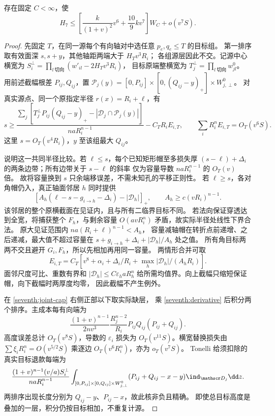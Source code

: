 \begin{lemma}[完整实际软价格]\label{seventh:local-price}
存在固定 \(C<\infty\)，使
\begin{equation}\label{seventh:soft-price}
 H_7\le
 \left[\frac{k}{(1+v)^2}v^6+\frac{10}{9}kv^7\right]W_C+o(v^7S).
\end{equation}
\end{lemma}
\begin{proof}
先固定 \(T\)，在同一源每个有向轴对中选任意 \(p_e,q_e\le T\) 的目标组。
第一排序取有效面深 \(s,s+y\)，其他轴距两端大于 \(H_Tv^3R_i\)；
各组源层因此不交。记源中心横宽为
\(S_i^\perp=\prod_{l\ \text{切向}}(w'_{il}-2H_Tv^3R_i)\)，
目标原端整横宽为 \(T_j^\perp=\prod_{l\ \text{切向}}w^0_{jl}\)。
用前述截幅根差 \(P_{ij},Q_{ij}\)，置
\(\mathcal P_j(y)=[0,P_{ij}]\times[0,(Q_{ij}-y)_+]\times W^0_{j,\perp}\)。
对真实源点、同一个原指定半径 \(r(x)=R_i+\ell\)，有
\begin{equation}\label{seventh:joint-cap}
 s\ge
 \frac{\sum_j[T_j^\perp P_{ij}(Q_{ij}-y)_+
                    -|\mathscr D_j\cap\mathcal P_j(y)|]}
      {naR_i^{n-1}}-C_TR_iE_{i,T},
 \qquad \sum_iR_i^nE_{i,T}=O_T(v^6S).
\end{equation}
这里 \(s=O_T(v^4R_i)\)，\(y\) 至该组最大 \(Q_{ij}\)。

说明这一共同半径比较。若 \(\ell\le s\)，每个已知矩形帽至多损失厚
\((s-\ell)+\Delta_i\) 的两条边带；所有边带关于 \(s-\ell\) 的斜率
仅为容量导数 \(naR_i^{n-1}\) 的 \(O_T(v)\) 倍。
故将容量换到 \(s\) 只余端移误差，不需未知孔的平移正则性。
若 \(\ell\ge s\)，各对角帽仍入，真正轴面邻居 \(h\) 同时提供
\[
 [A_h(\ell-s-g_{i\to h}-\Delta_i)-|\mathscr D_h|]_+,\qquad
 A_h\ge c(vR_i)^{n-1}.
\]
该邻居的整个原横截面在见证内，且与所有二临界目标不同。
若法向保证穿透达到全宽，将捕获整个 \(F_h\)，与剩余容量
\(O(avR_i^n)\) 矛盾，故实际半径处线性下界合法。
原大见证范围内 \(na(R_i+\ell)^{n-1}<A_h\)，
容量减轴帽在转折点前递增、之后递减，最大值不超过容量在
\(s+g_{i\to h}+\Delta_i+|\mathscr D_h|/A_h\) 处之值。
所有角目标两两不交且避开 \(G_i,F_h\)，所以先相加再用同一容量。
两情形合并可取
\[
 E_{i,T}=C_T\left[v^8+\alpha_i+\Delta_i/R_i+
                   \max_h|\mathscr D_h|/(A_hR_i)\right].
\]
面邻尺度可比、重数有界和 \(|\mathscr D_h|\le C\varepsilon_haR_h^n\)
给所需均值界。向上截幅只缩短保证帽，向下截幅时两厚度均零，
因此截幅不产生例外。

在 \eqref{seventh:joint-cap} 右侧正部以下取实际缺层，
乘 \eqref{seventh:derivative} 后积分两个排序。主成本每有向端为
\begin{equation}\label{seventh:main-cost}
 \frac{(1+v)^{n-1}}{2nv^3}\frac{R_j^{n-2}}{R_i}
          P_{ij}Q_{ij}(P_{ij}+Q_{ij}).
\end{equation}
高度误差总计 \(O_T(v^8S)\)，导数的 \(\varepsilon_i\) 损失为
\(O_T(v^{11}S)\)。横宽替换损失由 \(\sum\xi_iR_i^n=O(v^{5/2}S)\)
乘逐边 \(O_T(v^6R_i^n)\)，亦为 \(o_T(v^7S)\)。
Tonelli 给须扣除的真实目标退款每端为
\begin{equation}\label{seventh:refund-kernel}
 \frac{(1+v)^{n-1}(v/a)S_i^\perp}{naR_i^{n-1}}
 \int_{[0,P_{ij}]\times[0,Q_{ij}]\times W^0_{j,\perp}}
 (P_{ij}+Q_{ij}-x-y)\ind_{\mathscr D_j}\dd z .
\end{equation}
两排序出现长度分别为 \(Q_{ij}-y\)、\(P_{ij}-x\)，故此核非负且精确。
即使总目标高度是叠加的一层，积分仍按目标相加，不重复计源。


\end{proof}
